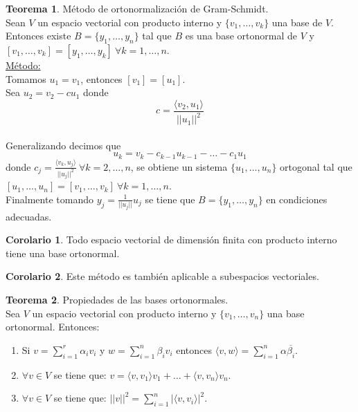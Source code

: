\documentclass[10pt]{article}
\theoremstyle{definition}
\newtheorem{theorem}{Teorema}[section]
\newtheorem{corollary}{Corolario}[theorem]
\begin{document}
\begin{theorem}{Método de ortonormalización de Gram-Schmidt.}
	\\Sean $V$ un espacio vectorial con producto interno y $\{v_1,\dots,v_k\}$ una base de $V$. Entonces existe \newline $B=\{y_1,\dots,y_n\}$ tal que $B$ es una base ortonormal de $V$ y $[v_1,\dots,v_k]=[y_1,\dots,y_k]\ \forall k=1,\dots,n$.\\
	\underline{Método:}
	\\Tomamos $u_1=v_1$, entonces $[v_1]=[u_1]$.
	\\Sea $u_2=v_2-cu_1$ donde $$c=\frac{\langle v_2,u_1 \rangle}{||u_1||^2}$$
	\\Generalizando decimos que $$u_k=v_k-c_{k-1}u_{k-1}-\dots-c_1u_1$$ donde $c_j=\frac{\langle v_k,u_j \rangle}{||u_j||^2}\ \forall k=2,\dots,n$, se obtiene un sistema $\{u_1,\dots,u_n\}$ ortogonal tal que $[u_1,\dots,u_n]=[v_1,\dots,v_k]\ \forall k=1,\dots,n$.
	\\Finalmente tomando $y_j=\frac{1}{||u_j||}u_j$ se tiene que $B=\{y_1,\dots,y_n\}$ en condiciones adecuadas.
\end{theorem}
\begin{corollary}
	Todo espacio vectorial de dimensión finita con producto interno tiene una base ortonormal.
\end{corollary}
\begin{corollary}
	Este método es también aplicable a subespacios vectoriales.
\end{corollary}
\begin{theorem}{Propiedades de las bases ortonormales.}
	\\Sea $V$ un espacio vectorial con producto interno y $\{v_1,\dots,v_n\}$ una base ortonormal. Entonces:
	\begin{enumerate}
		\item Si $v=\sum_{i=1}^{r} \alpha_iv_i$ y $w=\sum_{i=1}^{n} \beta_iv_i$ entonces $\langle v,w \rangle=\sum_{i=1}^{n} \alpha \overline{\beta_i}$.
		\item $\forall v\in V$ se tiene que: $v=\langle v,v_1 \rangle v_1+\dots+\langle v,v_n \rangle v_n$.
		\item $\forall v\in V$ se tiene que: $||v||^2=\sum_{i=1}^{n} |\langle v,v_i \rangle|^2$.
	\end{enumerate}
\end{theorem}
\end{document}
